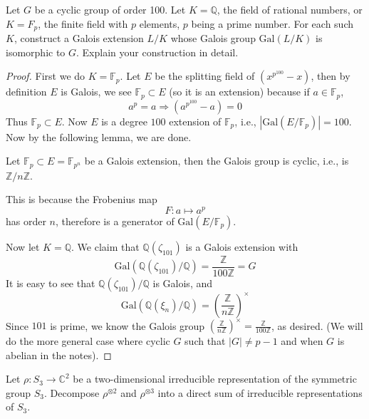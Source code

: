\documentclass[openany]{book}
\newcommand{\Z}{\mathbb{Z}}
\newcommand{\F}{\mathbb{F}}
\newcommand{\Q}{\mathbb{Q}}
\newcommand{\gal}{\text{Gal}}
\begin{document}
\begin{prob}
    Let \(G\) be a cyclic group of order 100. Let \(K=\mathbb{Q}\), the field of rational numbers, or \(K=F_p\), the finite field with \(p\) elements, \(p\) being a prime number. For each such \(K\), construct a Galois extension \(L/K\) whose Galois group \(\text{Gal}(L/K)\) is isomorphic to \(G\). Explain your construction in detail.
\end{prob}
\begin{proof}
    First we do $K=\F_p$. Let $E$ be the splitting field of $(x^{p^{100}}-x)$, then by definition $E$ is Galois, we see $\F_p\subset E$ (so it is an extension) because if $a\in\F_p$,
    \begin{equation*}
        a^p=a\Rightarrow (a^{p^{100}}-a)=0
    \end{equation*}
    Thus $\F_p\subset E$. Now $E$ is a degree $100$ extension of $\F_p$, i.e., $\left|\gal(E/\F_p)\right|=100$. Now by the following lemma, we are done.
    \begin{lem}
        Let $\F_p\subset E=\F_{p^n}$ be a Galois extension, then the Galois group is cyclic, i.e., is $\Z/n\Z$.
    \end{lem}
    This is because the Frobenius map 
    \begin{equation*}
        F: a\mapsto a^{p}
    \end{equation*}
    has order $n$, therefore is a generator of $\gal(E/\F_p)$. 

    Now let $K=\Q$. We claim that $\Q(\zeta_{101})$ is a Galois extension with 
    \begin{equation*}
        \gal(\Q(\zeta_{101})/\Q)=\frac{\Z}{100\Z}=G
    \end{equation*}
    It is easy to see that $\Q(\zeta_{101})/\Q$ is Galois, and 
    \begin{equation*}
        \gal(\Q(\xi_n)/\Q)=\left(\frac{\Z}{n\Z}\right)^\times
    \end{equation*}
    Since $101$ is prime, we know the Galois group $\left(\frac{\Z}{n\Z}\right)^\times=\frac{\Z}{100\Z}$, as desired. (We will do the more general case where cyclic $G$ such that $|G|\neq p-1$ and when $G$ is abelian in the notes).
\end{proof}




\begin{prob}
    Let \(\rho:S_3\to\mathbb{C}^2\) be a two-dimensional irreducible representation of the symmetric group \(S_3\). Decompose \(\rho^{\otimes 2}\) and \(\rho^{\otimes 3}\) into a direct sum of irreducible representations of \(S_3\).
\end{prob}
\end{document}
